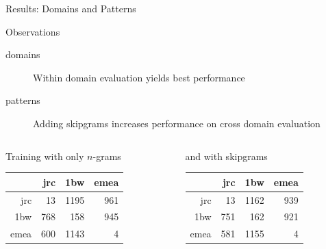 \begin{frame}{Results: Domains and Patterns}

    \begin{block}{Observations}
        \begin{description}
            \item[domains] Within domain evaluation yields best performance
            \item[patterns] Adding skipgrams increases performance on cross domain evaluation
        \end{description}
    \end{block}
    \vspace{-1em}
    {\small
        \begin{columns}[T,totalwidth=\textwidth]
            \begin{column}{0.5\textwidth}
                \begin{block}{Training with only $n$-grams}
                    \begin{tabular}{rrrr}
                            & jrc & 1bw  & emea \\ \hline
                        jrc & 13  & 1195 & 961 \\
                        1bw & 768 & 158  & 945 \\
                        emea& 600 & 1143 & 4
                    \end{tabular}
                \end{block}
            \end{column}
            \begin{column}{0.5\textwidth}
                \begin{block}{and with skipgrams}
                    \begin{tabular}{rrrr}
                            & jrc & 1bw  & emea \\ \hline
                        jrc & 13  & 1162 & 939 \\
                        1bw & 751 & 162  & 921 \\
                        emea& 581 & 1155 & 4
                    \end{tabular}
                \end{block}
            \end{column}
        \end{columns}
        \hspace{1em}
}
\end{frame}

